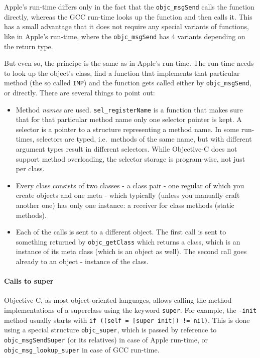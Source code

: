Apple's run-time differs only in the fact that the \verb=objc_msgSend= calls the function directly, whereas the GCC run-time looks up the function and then calls it. This has a small advantage that it does not require any special variants of functions, like in Apple's run-time, where the \verb=objc_msgSend= has 4 variants depending on the return type.

\hspace{20pt}

But even so, the principe is the same as in Apple's run-time. The run-time needs to look up the object's class, find a function that implements that particular method (the so called \verb=IMP=) and the function gets called either by \verb=objc_msgSend=, or directly. There are several things to point out:

\begin{itemize}
\item Method \emph{names} are used. \verb=sel_registerName= is a function that makes sure that for that particular method name only one selector pointer is kept. A selector is a pointer to a structure representing a method name. In some run-times, selectors are typed, i.e.\ methods of the same name, but with different argument types result in different selectors. While Objective-C does not support method overloading, the selector storage is program-wise, not just per class.
\item Every class consists of two classes - a class pair - one regular of which you create objects and one meta - which typically (unless you manually craft another one) has only one instance: a receiver for class methods (static methods).
\item Each of the calls is sent to a different object. The first call is sent to something returned by \verb=objc_getClass= which returns a class, which is an instance of its meta class (which is an object as well). The second call goes already to an object - instance of the class.
\end{itemize}

\paragraph{Calls to super}

Objective-C, as most object-oriented languages, allows calling the method implementations of a superclass using the keyword \verb=super=. For example, the \verb=-init= method usually starts with \verb#if ((self = [super init]) != nil)#. This is done using a special structure \verb=objc_super=, which is passed by reference to \verb=objc_msgSendSuper= (or its relatives) in case of Apple run-time, or \newline{}\verb=objc_msg_lookup_super= in case of GCC run-time.

